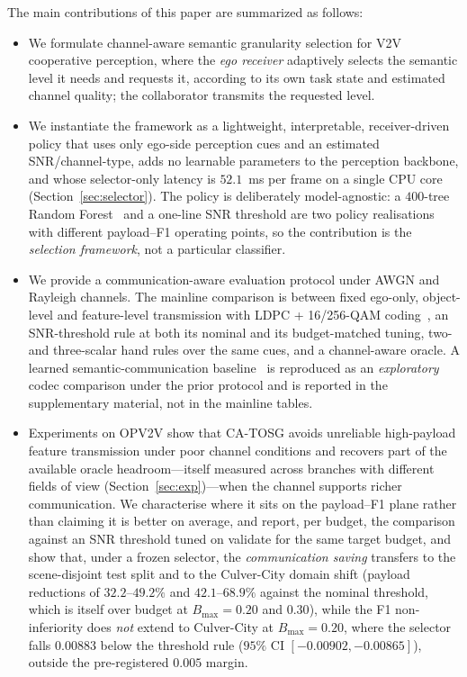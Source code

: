 \documentclass[journal]{IEEEtran}
\newcommand{\method}{CA-TOSG}
\begin{document}
The main contributions of this paper are summarized as follows:
\begin{itemize}
    \item We formulate channel-aware semantic granularity selection for V2V cooperative perception, where the \emph{ego receiver} adaptively selects the semantic level it needs and requests it, according to its own task state and estimated channel quality; the collaborator transmits the requested level.
    \item We instantiate the framework as a lightweight, interpretable, receiver-driven policy that uses only ego-side perception cues and an estimated SNR/channel-type, adds no learnable parameters to the perception backbone, and whose selector-only latency is $52.1$~ms per frame on a single CPU core (Section~\ref{sec:selector}). The policy is deliberately model-agnostic: a $400$-tree Random Forest~\cite{breiman2001random} and a one-line SNR threshold are two policy realisations with different payload--F1 operating points, so the contribution is the \emph{selection framework}, not a particular classifier.
    \item We provide a communication-aware evaluation protocol under AWGN and Rayleigh channels. The mainline comparison is between fixed ego-only, object-level and feature-level transmission with LDPC + 16/256-QAM coding~\cite{ieee80211bd}, an SNR-threshold rule at both its nominal and its budget-matched tuning, two- and three-scalar hand rules over the same cues, and a channel-aware oracle. A learned semantic-communication baseline~\cite{sheng2024importance} is reproduced as an \emph{exploratory} codec comparison under the prior protocol and is reported in the supplementary material, not in the mainline tables.
    \item Experiments on OPV2V show that \method{} avoids unreliable high-payload feature transmission under poor channel conditions and recovers part of the available oracle headroom---itself measured across branches with different fields of view (Section~\ref{sec:exp})---when the channel supports richer communication. We characterise where it sits on the payload--F1 plane rather than claiming it is better on average, and report, per budget, the comparison against an SNR threshold tuned on validate for the same target budget, and show that, under a frozen selector, the \emph{communication saving} transfers to the scene-disjoint test split and to the Culver-City domain shift (payload reductions of $32.2$--$49.2\%$ and $42.1$--$68.9\%$ against the nominal threshold, which is itself over budget at $B_{\max}=0.20$ and $0.30$), while the F1 non-inferiority does \emph{not} extend to Culver-City at $B_{\max}=0.20$, where the selector falls $0.00883$ below the threshold rule ($95\%$ CI $[-0.00902,-0.00865]$), outside the pre-registered $0.005$ margin.

\end{itemize}
\end{document}
